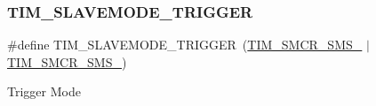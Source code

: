 \subsubsection{\texorpdfstring{T\+I\+M\+\_\+\+S\+L\+A\+V\+E\+M\+O\+D\+E\+\_\+\+T\+R\+I\+G\+G\+ER}{TIM\_SLAVEMODE\_TRIGGER}}
{\footnotesize\ttfamily \#define T\+I\+M\+\_\+\+S\+L\+A\+V\+E\+M\+O\+D\+E\+\_\+\+T\+R\+I\+G\+G\+ER~(\hyperlink{group___peripheral___registers___bits___definition_ga63847fc3c71f582403e6301b1229c3ed}{T\+I\+M\+\_\+\+S\+M\+C\+R\+\_\+\+S\+M\+S\+\_} $\vert$ \hyperlink{group___peripheral___registers___bits___definition_gaa980a3121ab6cda5a4a42b959da8421e}{T\+I\+M\+\_\+\+S\+M\+C\+R\+\_\+\+S\+M\+S\+\_})}

Trigger Mode 